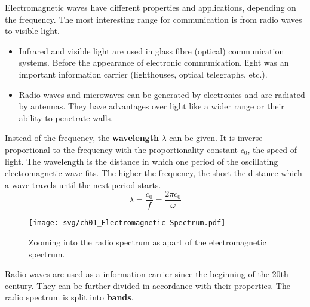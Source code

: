 \begin{refsection}
Electromagnetic waves have different properties and applications, depending on the frequency. The most interesting range for communication is from radio waves to visible light.
\begin{itemize}
	\item Infrared and visible light are used in glass fibre (optical) communication systems. Before the appearance of electronic communication, light was an important information carrier (lighthouses, optical telegraphs, etc.).
	\item Radio waves and microwaves can be generated by electronics and are radiated by antennas. They have advantages over light like a wider range or their ability to penetrate walls.
\end{itemize}

Instead of the frequency, the  \textbf{wavelength} $\lambda$ can be given. It is inverse proportional to the frequency with the proportionality constant $c_0$, the speed of light. The wavelength is the distance in which one period of the oscillating electromagnetic wave fits. The higher the frequency, the short the distance which a wave travels until the next period starts.
\begin{equation}
	\lambda = \frac{c_0}{f} = \frac{2 \pi c_0}{\omega}
\end{equation}

\begin{figure}[H]
	\centering
	\texttt{[image: svg/ch01\_Electromagnetic-Spectrum.pdf]}
	\caption{Zooming into the radio spectrum as apart of the electromagnetic spectrum. }
\end{figure}

Radio waves are used as a information carrier since the beginning of the 20th century. They can be further divided in accordance with their properties. The radio spectrum is split into  \textbf{bands}.


\end{refsection}
